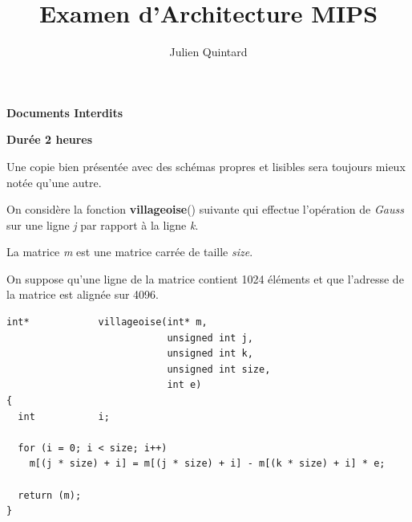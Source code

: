 %
%
%
%
%
%

%
%

\def\path{../../../..}

%
%



%
%


%
%

\title{Examen d'Architecture MIPS}

%
%

\author{\small{Julien Quintard}}

%
%



%
%

\maketitle

%
%

\begin{center}

\textbf{Documents Interdits}

\textbf{Dur\'ee 2 heures}

\scriptsize{Une copie bien pr\'esent\'ee avec des sch\'emas propres et
	    lisibles sera toujours mieux not\'ee qu'une autre.}
\end{center}

%
%

On consid\`ere la fonction \textbf{villageoise}() suivante qui effectue
l'op\'eration de \textit{Gauss} sur une ligne \textit{j} par rapport \`a
la ligne \textit{k}.

La matrice \textit{m} est une matrice carr\'ee de taille \textit{size}.

On suppose qu'une ligne de la matrice contient 1024 \'el\'ements
et que l'adresse de la matrice est align\'ee sur 4096.

\begin{verbatim}
int*            villageoise(int* m,
                            unsigned int j,
                            unsigned int k,
                            unsigned int size,
                            int e)
{
  int           i;

  for (i = 0; i < size; i++)
    m[(j * size) + i] = m[(j * size) + i] - m[(k * size) + i] * e;

  return (m);
}
\end{verbatim}

